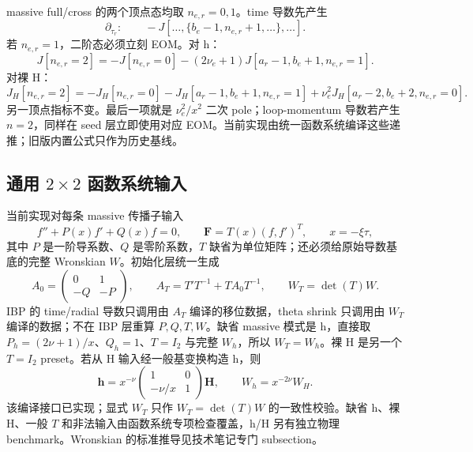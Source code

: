 ﻿\documentclass[a4paper,11pt]{article}
\begin{document}
massive full/cross 的两个顶点态均取 $n_{e,r}=0,1$。time 导数先产生
\begin{equation}
 \partial_{\tau_r}:\qquad
 -J[\ldots,\{b_e-1,n_{e,r}+1,\ldots\},\ldots].
\end{equation}
若 $n_{e,r}=1$，二阶态必须立刻 EOM。对 h：
\begin{equation}
 J[n_{e,r}=2]
 =-J[n_{e,r}=0]
  -(2\nu_e+1)J[a_r-1,b_e+1,n_{e,r}=1].
 \label{massiveEOM}
\end{equation}
对裸 H：
\begin{equation}
 J_H[n_{e,r}=2]
 =-J_H[n_{e,r}=0]
  -J_H[a_r-1,b_e+1,n_{e,r}=1]
  +\nu_e^2J_H[a_r-2,b_e+2,n_{e,r}=0].
 \label{bareHEOM}
\end{equation}
另一顶点指标不变。最后一项就是 $\nu_e^2/x^2$ 二次 pole；loop-momentum 导数若产生 $n=2$，同样在 seed 层立即使用对应 EOM。当前实现由统一函数系统编译这些递推；旧版内置公式只作为历史基线。

\subsection{通用 $2\times2$ 函数系统输入}

当前实现对每条 massive 传播子输入
\begin{equation}
 f''+P(x)f'+Q(x)f=0,
 \qquad \mathbf F=T(x)(f,f')^T,
 \qquad x=-\xi\tau,
\end{equation}
其中 $P$ 是一阶导系数、$Q$ 是零阶系数，$T$ 缺省为单位矩阵；还必须给原始导数基底的完整 Wronskian $W$。初始化层统一生成
\begin{equation}
 A_0=\begin{pmatrix}0&1\\-Q&-P\end{pmatrix},
 \qquad
 A_T=T'T^{-1}+TA_0T^{-1},
 \qquad
 W_T=\det(T)W.
\end{equation}
IBP 的 time/radial 导数只调用由 $A_T$ 编译的移位数据，theta shrink 只调用由 $W_T$ 编译的数据；不在 IBP 层重算 $P,Q,T,W$。缺省 massive 模式是 h，直接取 $P_h=(2\nu+1)/x$、$Q_h=1$、$T=I_2$ 与完整 $W_h$，所以 $W_T=W_h$。裸 H 是另一个 $T=I_2$ preset。若从 H 输入经一般基变换构造 h，则
\begin{equation}
 \mathbf h=x^{-\nu}\begin{pmatrix}1&0\\-\nu/x&1\end{pmatrix}\mathbf H,
 \qquad W_h=x^{-2\nu}W_H.
\end{equation}
该编译接口已实现；显式 $W_T$ 只作 $W_T=\det(T)W$ 的一致性校验。缺省 h、裸 H、一般 $T$ 和非法输入由函数系统专项检查覆盖，h/H 另有独立物理 benchmark。Wronskian 的标准推导见技术笔记专门 subsection。
\end{document}
